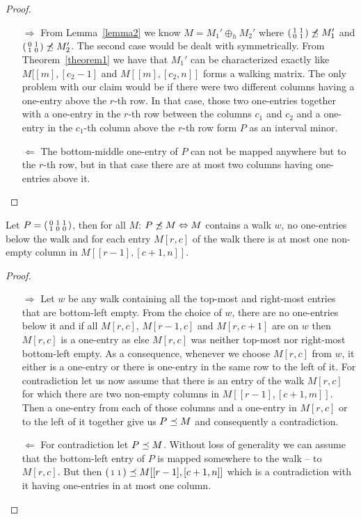\begin{proof}
\begin{itemize}
\item[$\Rightarrow$] From Lemma~\ref{lemma2} we know $M=M_1'\oplus_hM_2'$ where $\left(\begin{smallmatrix}1&1\\0&1\end{smallmatrix}\right)\not\preceq M_1'$ and $\left(\begin{smallmatrix}0&1\\1&0\end{smallmatrix}\right)\not\preceq M_2'$. The second case would be dealt with symmetrically. From Theorem~\ref{theorem1} we have that $M_1'$ can be characterized exactly like $M[[m],[c_2-1]$ and $M[[m],[c_2,n]]$ forms a walking matrix. The only problem with our claim would be if there were two different columns having a one-entry above the $r$-th row. In that case, those two one-entries together with a one-entry in the $r$-th row between the columns $c_1$ and $c_2$ and a one-entry in the $c_1$-th column above the $r$-th row form $P$ as an interval minor.
\item[$\Leftarrow$] The bottom-middle one-entry of $P$ can not be mapped anywhere but to the $r$-th row, but in that case there are at most two columns having one-entries above it. %
\end{itemize}
\end{proof}
\begin{thm}
Let $P=\left(\begin{smallmatrix}0&1&1\\1&0&0\end{smallmatrix}\right)$, then for all $M$: $P\not\preceq M\Leftrightarrow M$ contains a walk $w$, no one-entries below the walk and for each entry $M[r,c]$ of the walk there is at most one non-empty column in $M[[r-1],[c+1,n]]$.
\end{thm}
\begin{proof}
\begin{itemize}
\item[$\Rightarrow$] Let $w$ be any walk containing all the top-most and right-most entries that are bottom-left empty. From the choice of $w$, there are no one-entries below it and if all $M[r,c]$, $M[r-1,c]$ and $M[r,c+1]$ are on $w$ then $M[r,c]$ is a one-entry as else $M[r,c]$ was neither top-most nor right-most bottom-left empty. As a consequence, whenever we choose $M[r,c]$ from $w$, it either is a one-entry or there is one-entry in the same row to the left of it. For contradiction let us now assume that there is an entry of the walk $M[r,c]$ for which there are two non-empty columns in $M[[r-1],[c+1,m]]$. Then a one-entry from each of those columns and a one-entry in $M[r,c]$ or to the left of it together give us $P\preceq M$ and consequently a contradiction. 
\item[$\Leftarrow$] For contradiction let $P\preceq M$. Without loss of generality we can assume that the bottom-left entry of $P$ is mapped somewhere to the walk -- to $M[r,c]$. But then $\left(\begin{smallmatrix}1&1\end{smallmatrix}\right)\preceq M[[r-1],[c+1,n]]$ which is a contradiction with it having one-entries in at most one column.
\end{itemize}
\end{proof}